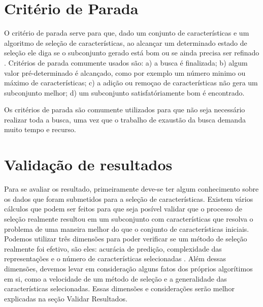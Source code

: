 \section{Critério de Parada}

O critério de parada serve para que, dado um conjunto de características e um algoritmo de seleção de características, ao alcançar um determinado estado de seleção ele diga se o subconjunto gerado está bom ou se ainda precisa ser refinado \cite{dash_1997}. Critérios de parada comumente usados são: a) a busca é finalizada; b) algum valor pré-determinado é alcançado, como por exemplo um número minimo ou máximo de características; c) a adição ou remoçao de características não gera um subconjunto melhor; d) um subconjunto satisfatóriamente bom é encontrado.

Os critérios de parada são comumente utilizados para que não seja necessário realizar toda a busca, uma vez que o trabalho de exaustão da busca demanda muito tempo e recurso.

\section{Validação de resultados}

Para se avaliar os resultado, primeiramente deve-se ter algum conhecimento sobre os dados que foram submetidos para a seleção de características. Existem vários cálculos que podem ser feitos para que seja posível validar que o processo de seleção realmente resultou em um subconjunto com características que resolva o problema de uma maneira melhor do que o conjunto de características iniciais. Podemos utilizar três dimensões para poder verificar se um método de seleção realmente foi efetivo, são eles: acurácia de predição, complexidade das representações e o número de características selecionadas \cite{huan_1998}. Além dessas dimensões, devemos levar em consideração alguns fatos dos próprios algorítimos em si, como a velocidade de um método de seleção e a generalidade das características selecionadas. Essas dimensões e considerações serão melhor explicadas na seção Validar Resultados.

